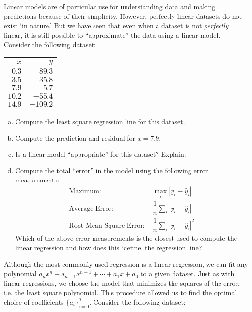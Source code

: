 \documentclass[11pt,letterpaper]{article}
\begin{document}


 Linear models are of particular use for understanding data and making predictions because of their simplicity. However, perfectly linear datasets do not exist `in nature.' But we have seen that even when a dataset is not \textit{perfectly} linear, it is still possible to ``approximate'' the data using a linear model. Consider the following dataset:

	\begin{table}[!ht]
	\centering
	\begin{tabular}{r|r}
	$x$ & $y$ \\ \hline
	$0.3$ & $89.3$ \\
	$3.5$ & $35.8$ \\
	$7.9$ & $5.7$ \\
	$10.2$ & $-55.4$ \\
	$14.9$ & $-109.2$
	\end{tabular}
	\end{table}

\begin{enumerate}[(a)]
\item Compute the least square regression line for this dataset. 
\item Compute the prediction and residual for $x= 7.9$. 
\item Is a linear model ``appropriate'' for this dataset? Explain. 
\item Compute the total ``error'' in the model using the following error measurements:
	\[
	\begin{aligned}
	\text{Maximum: }& \max_i |y_i - \widehat{y}_i| \\
	\text{Average Error: }& \dfrac{1}{n} \sum_i |y_i - \widehat{y}_i| \\
	\text{Root Mean-Square Error: }& \dfrac{1}{n} \sum_i |y_i - \widehat{y}_i|^2
	\end{aligned}
	\]
Which of the above error measurements is the closest used to compute the linear regression and how does this `define' the regression line?
\end{enumerate}



\newpage



 Although the most commonly used regression is a linear regression, we can fit any polynomial $a_n x^n + a_{n-1} x^{n-1} + \cdots + a_1x + a_0$ to a given dataset. Just as with linear regressions, we choose the model that minimizes the squares of the error, i.e. the least square polynomial. This procedure allowed us to find the optimal choice of coefficients $\{ a_i \}_{i=0}^n$. Consider the following dataset:
\end{document}
